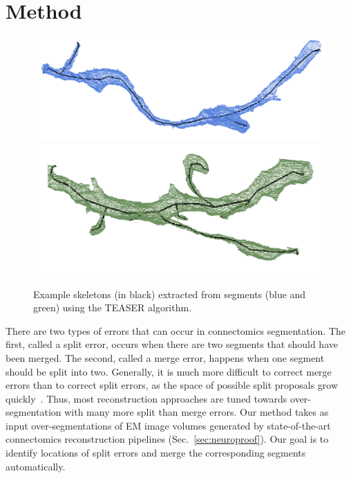\section{Method}

\begin{figure}[t]
	\centering
	\includegraphics[width=0.92\linewidth]{./figures/skeleton1.png}
	\includegraphics[width=0.92\linewidth]{./figures/skeleton2.png}
	\caption{Example skeletons (in black) extracted from segments (blue and green) using the TEASER algorithm.}
	\label{fig:skeletonization}
\end{figure}

There are two types of errors that can occur in connectomics segmentation.
The first, called a split error, occurs when there are two segments that should have been merged. The second, called a merge error, happens when one segment should be split into two. Generally, it is much more difficult to correct merge errors than to correct split errors,
as the space of possible split proposals grow quickly~\cite{parag2015properties}.
Thus, most reconstruction approaches are tuned towards over-segmentation with many more split than merge errors. Our method takes as input over-segmentations of EM image volumes generated by state-of-the-art connectomics reconstruction pipelines (Sec.~\ref{sec:neuroproof}). Our goal is to identify locations of split errors and merge the corresponding segments automatically.

